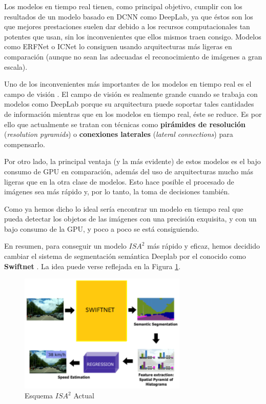 Los modelos en tiempo real tienen, como principal objetivo, cumplir con los resultados de un modelo basado en \ac{DCNN} como DeepLab, ya que éstos son los que mejores prestaciones suelen dar debido a los recursos computacionales tan potentes que usan, sin los inconvenientes que ellos mismos traen consigo. Modelos como ERFNet \cite{erfnet} o ICNet \cite{icnet} lo consiguen usando arquitecturas más ligeras en comparación (aunque no sean las adecuadas el reconocimiento de imágenes a gran escala).

Uno de los inconvenientes más importantes de los modelos en tiempo real es el campo de visión \cite{swiftnet}. El campo de visión es realmente grande cuando se trabaja con modelos como DeepLab porque su arquitectura puede soportar tales cantidades de información mientras que en los modelos en tiempo real, éste se reduce. Es por ello que actualmente se tratan con técnicas como \textbf{pirámides de resolución} (\textit{resolution pyramids}) o \textbf{conexiones laterales} (\textit{lateral connections}) para compensarlo.

Por otro lado, la principal ventaja (y la más evidente) de estos modelos es el bajo consumo de GPU en comparación, además del uso de arquitecturas mucho más ligeras que en la otra clase de modelos. Esto hace posible el procesado de imágenes sea más rápido y, por lo tanto, la toma de decisiones también.

Como ya hemos dicho lo ideal sería encontrar un modelo en tiempo real que pueda detectar los objetos de las imágenes con una precisión exquisita, y con un bajo consumo de la GPU, y poco a poco se está consiguiendo.


En resumen, para conseguir un modelo $ISA^{2}$ más rápido y eficaz, hemos decidido cambiar el sistema de segmentación semántica Deeplab por el conocido como \textbf{Swiftnet} \cite{swiftnet}. La idea puede verse reflejada en la Figura \ref{fig:Isa_v2}.

\begin{figure}[H]
  \centering
  \includegraphics[width=8cm]{Figuras/Figura_Esquema_ISA2_Version_2.eps}
  \caption{Esquema $ISA^{2}$ Actual}
    \label{fig:Isa_v2}
\end{figure}


